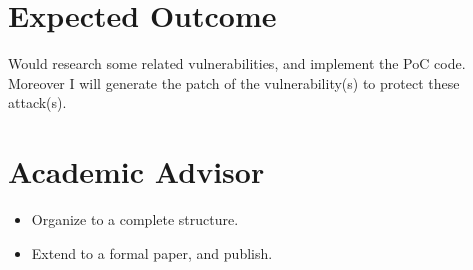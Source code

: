 \documentclass[12pt,a4paper,oneside,draft]{IEEEconf}
\begin{document}
\section{Expected Outcome}
Would research some related vulnerabilities, and implement the PoC code. 
Moreover I will generate the patch of the vulnerability(s) to protect these attack(s).

\printbibheading[heading=bibnumbered]
\printbibliography\newrefcontext

\section{Academic Advisor}
\begin{itemize}
  \item Organize to a complete structure.
  \item Extend to a formal paper, and publish.
\end{itemize} 
\end{document}
